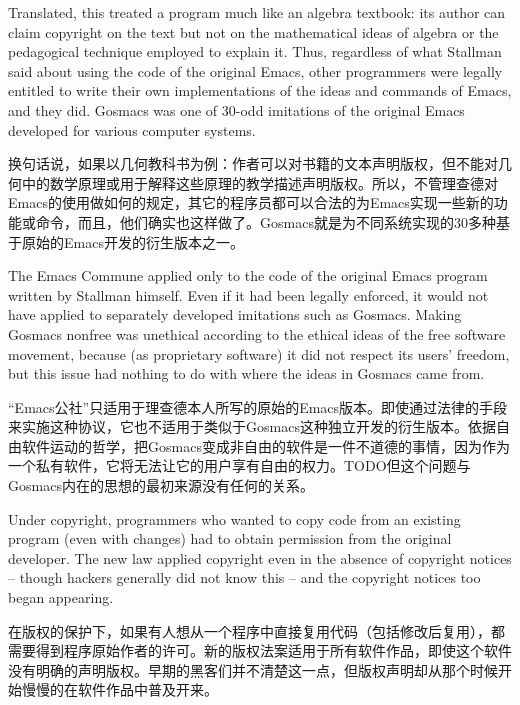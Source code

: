 \ifdefined\eng
Translated, this treated a program much like an algebra textbook: its author can claim copyright on the text but not on the mathematical ideas of algebra or the pedagogical technique employed to explain it.  Thus, regardless of what Stallman said about using the code of the original Emacs, other programmers were legally entitled to write their own implementations of the ideas and commands of Emacs, and they did.  Gosmacs was one of 30-odd imitations of the original Emacs developed for various computer systems.
\fi

\ifdefined\chs
换句话说，如果以几何教科书为例：作者可以对书籍的文本声明版权，但不能对几何中的数学原理或用于解释这些原理的教学描述声明版权。所以，不管理查德对Emacs的使用做如何的规定，其它的程序员都可以合法的为Emacs实现一些新的功能或命令，而且，他们确实也这样做了。Gosmacs就是为不同系统实现的30多种基于原始的Emacs开发的衍生版本之一。
\fi

\ifdefined\eng
The Emacs Commune applied only to the code of the original Emacs program written by Stallman himself.  Even if it had been legally enforced, it would not have applied to separately developed imitations such as Gosmacs.  Making Gosmacs nonfree was unethical according to the ethical ideas of the free software movement, because (as proprietary software) it did not respect its users' freedom, but this issue had nothing to do with where the ideas in Gosmacs came from.
\fi

\ifdefined\chs
“Emacs公社”只适用于理查德本人所写的原始的Emacs版本。即使通过法律的手段来实施这种协议，它也不适用于类似于Gosmacs这种独立开发的衍生版本。依据自由软件运动的哲学，把Gosmacs变成非自由的软件是一件不道德的事情，因为作为一个私有软件，它将无法让它的用户享有自由的权力。TODO但这个问题与Gosmacs内在的思想的最初来源没有任何的关系。
\fi

\ifdefined\eng
Under copyright, programmers who wanted to copy code from an existing program (even with changes) had to obtain permission from the original developer. The new law applied copyright even in the absence of copyright notices -- though hackers generally did not know this -- and the copyright notices too began appearing.
\fi

\ifdefined\chs
在版权的保护下，如果有人想从一个程序中直接复用代码（包括修改后复用），都需要得到程序原始作者的许可。新的版权法案适用于所有软件作品，即使这个软件没有明确的声明版权。早期的黑客们并不清楚这一点，但版权声明却从那个时候开始慢慢的在软件作品中普及开来。
\fi

